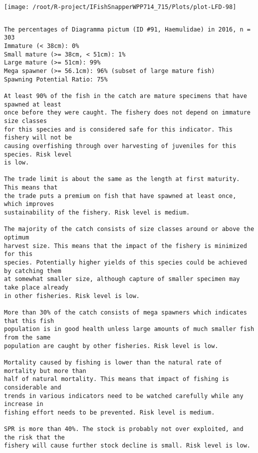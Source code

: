 \documentclass{report}\usepackage[]{graphicx}\usepackage[]{color}
\makeatletter
\def\maxwidth{ %
  \ifdim\Gin@nat@width>\linewidth
    \linewidth
  \else
    \Gin@nat@width
  \fi
}
\newenvironment{kframe}{%
 \def\at@end@of@kframe{}%
 \ifinner\ifhmode%
  \def\at@end@of@kframe{\end{minipage}}%
  \begin{minipage}{\columnwidth}%
 \fi\fi%
 \def\FrameCommand##1{\hskip\@totalleftmargin \hskip-\fboxsep
 \colorbox{shadecolor}{##1}\hskip-\fboxsep
     \hskip-\linewidth \hskip-\@totalleftmargin \hskip\columnwidth}%
 \MakeFramed {\advance\hsize-\width
   \@totalleftmargin\z@ \linewidth\hsize
   \@setminipage}}%
 {\par\unskip\endMakeFramed%
 \at@end@of@kframe}
\newenvironment{knitrout}{}{} %
\makeatother
\begin{document}
\begin{knitrout}
\texttt{[image: /root/R-project/IFishSnapperWPP714\_715/Plots/plot-LFD-98]} 
\begin{kframe}\begin{verbatim}
\end{verbatim}
\end{kframe}
\clearpage
\newpage
\begin{kframe}\begin{verbatim}The percentages of Diagramma pictum (ID #91, Haemulidae) in 2016, n = 303
Immature (< 38cm): 0%
Small mature (>= 38cm, < 51cm): 1%
Large mature (>= 51cm): 99%
Mega spawner (>= 56.1cm): 96% (subset of large mature fish)
Spawning Potential Ratio: 75%
 
At least 90% of the fish in the catch are mature specimens that have spawned at least
once before they were caught. The fishery does not depend on immature size classes
for this species and is considered safe for this indicator. This fishery will not be
causing overfishing through over harvesting of juveniles for this species. Risk level
is low.

The trade limit is about the same as the length at first maturity.  This means that
the trade puts a premium on fish that have spawned at least once, which improves
sustainability of the fishery. Risk level is medium.

The majority of the catch consists of size classes around or above the optimum
harvest size. This means that the impact of the fishery is minimized for this
species. Potentially higher yields of this species could be achieved by catching them
at somewhat smaller size, although capture of smaller specimen may take place already
in other fisheries. Risk level is low.

More than 30% of the catch consists of mega spawners which indicates that this fish
population is in good health unless large amounts of much smaller fish from the same
population are caught by other fisheries. Risk level is low.
 
Mortality caused by fishing is lower than the natural rate of mortality but more than
half of natural mortality. This means that impact of fishing is considerable and
trends in various indicators need to be watched carefully while any increase in
fishing effort needs to be prevented. Risk level is medium.
 
SPR is more than 40%. The stock is probably not over exploited, and the risk that the
fishery will cause further stock decline is small. Risk level is low.
 

\end{verbatim}
\end{kframe}
\end{knitrout}
\end{document}
